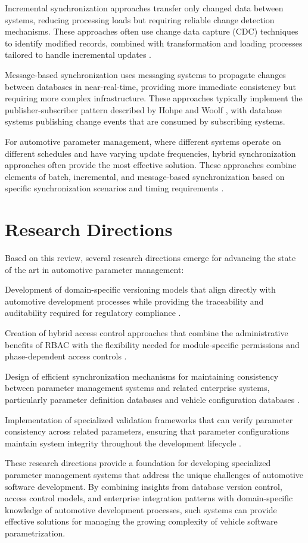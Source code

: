 Incremental synchronization approaches transfer only changed data between systems, reducing processing loads but requiring reliable change detection mechanisms. These approaches often use change data capture (CDC) techniques to identify modified records, combined with transformation and loading processes tailored to handle incremental updates \cite{seenivasan2023real}.

Message-based synchronization uses messaging systems to propagate changes between databases in near-real-time, providing more immediate consistency but requiring more complex infrastructure. These approaches typically implement the publisher-subscriber pattern described by Hohpe and Woolf \cite{hohpe2002enterprise}, with database systems publishing change events that are consumed by subscribing systems.

For automotive parameter management, where different systems operate on different schedules and have varying update frequencies, hybrid synchronization approaches often provide the most effective solution. These approaches combine elements of batch, incremental, and message-based synchronization based on specific synchronization scenarios and timing requirements \cite{mueller2018conception}.

\section{Research Directions}
\label{sec:research-directions}

Based on this review, several research directions emerge for advancing the state of the art in automotive parameter management:

Development of domain-specific versioning models that align directly with automotive development processes while providing the traceability and auditability required for regulatory compliance \cite{staron2021automotive}.

Creation of hybrid access control approaches that combine the administrative benefits of RBAC with the flexibility needed for module-specific permissions and phase-dependent access controls \cite{ferraiolo2011policy, xu2014specification}.

Design of efficient synchronization mechanisms for maintaining consistency between parameter management systems and related enterprise systems, particularly parameter definition databases and vehicle configuration databases \cite{mueller2018conception, hohpe2002enterprise}.

Implementation of specialized validation frameworks that can verify parameter consistency across related parameters, ensuring that parameter configurations maintain system integrity throughout the development lifecycle \cite{broy2006challenges, staron2021automotive}.

These research directions provide a foundation for developing specialized parameter management systems that address the unique challenges of automotive software development. By combining insights from database version control, access control models, and enterprise integration patterns with domain-specific knowledge of automotive development processes, such systems can provide effective solutions for managing the growing complexity of vehicle software parametrization.